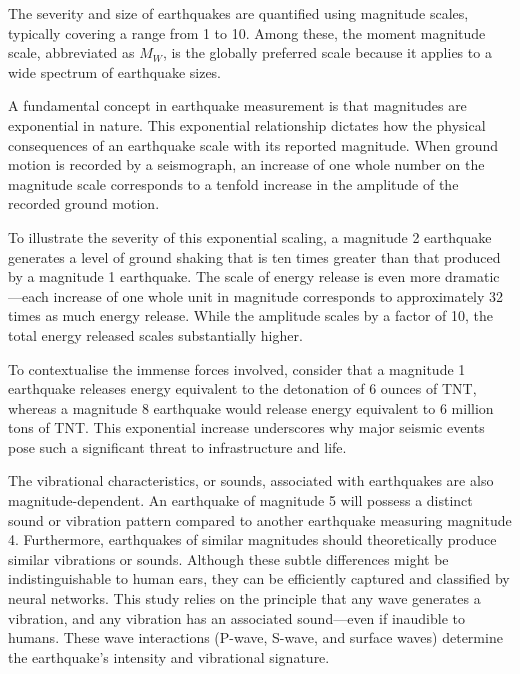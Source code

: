 {\fontsize{12pt}{18pt}\selectfont
The severity and size of earthquakes are quantified using magnitude scales, typically covering a range from 1 to 10. Among these, the moment magnitude scale, abbreviated as $M_W$, is the globally preferred scale because it applies to a wide spectrum of earthquake sizes.

A fundamental concept in earthquake measurement is that magnitudes are exponential in nature. This exponential relationship dictates how the physical consequences of an earthquake scale with its reported magnitude. When ground motion is recorded by a seismograph, an increase of one whole number on the magnitude scale corresponds to a tenfold increase in the amplitude of the recorded ground motion.

To illustrate the severity of this exponential scaling, a magnitude 2 earthquake generates a level of ground shaking that is ten times greater than that produced by a magnitude 1 earthquake. The scale of energy release is even more dramatic—each increase of one whole unit in magnitude corresponds to approximately 32 times as much energy release. While the amplitude scales by a factor of 10, the total energy released scales substantially higher.

To contextualise the immense forces involved, consider that a magnitude 1 earthquake releases energy equivalent to the detonation of 6 ounces of TNT, whereas a magnitude 8 earthquake would release energy equivalent to 6 million tons of TNT. This exponential increase underscores why major seismic events pose such a significant threat to infrastructure and life.

The vibrational characteristics, or sounds, associated with earthquakes are also magnitude-dependent. An earthquake of magnitude 5 will possess a distinct sound or vibration pattern compared to another earthquake measuring magnitude 4. Furthermore, earthquakes of similar magnitudes should theoretically produce similar vibrations or sounds. Although these subtle differences might be indistinguishable to human ears, they can be efficiently captured and classified by neural networks. This study relies on the principle that any wave generates a vibration, and any vibration has an associated sound—even if inaudible to humans. These wave interactions (P-wave, S-wave, and surface waves) determine the earthquake’s intensity and vibrational signature.
} 

\newpage
\vspace{0.6cm}
\vspace{0.2cm}

